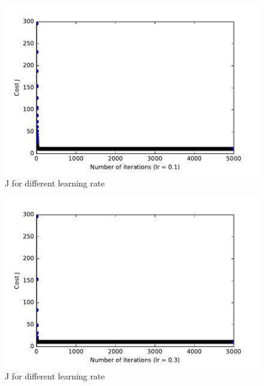 \documentclass[pdftex,11pt]{article}
\begin{document}
\begin{figure}
  \caption{J for different learning rate}
  \centering
    \includegraphics[scale=1]{fig01.pdf}
\end{figure}
\begin{figure}
  \caption{J for different learning rate}
  \centering
    \includegraphics[scale=1]{fig03.pdf}
\end{figure}
\end{document}

